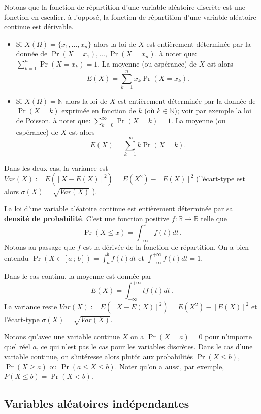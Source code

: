 \documentclass[12pt, a4paper]{book}
\numberwithin{equation}{section}
\newcommand{\N}{{\mathbb N}}
\begin{document}
Notons que la fonction de répartition d'une variable aléatoire discrète est une fonction en escalier.
à l'opposé, la fonction de répartition d'une variable aléatoire continue est dérivable.

\begin{itemize}
  \item Si $X(\Omega)=\{x_1,\hdots, x_n \}$ alors la loi de $X$ est entièrement déterminée par la donnée de $\Pr(X=x_1), \hdots, \Pr(X=x_n)$. à noter que: $\sum_{k=1}^n \Pr(X=x_k) =1$. La moyenne (ou espérance) de $X$ est alors 
\[ E(X)=\sum_{k=1}^n x_k \Pr(X=x_k). \]
	\item Si $X(\Omega)=\mathbb{\N}$ alors la loi de $X$ est entièrement déterminée
par la donnée de $\Pr(X=k)$ exprimée en fonction de $k$ (où $k \in \mathbb{\N}$);
voir par exemple la loi de Poisson. à noter que: $\sum_{k=0}^\infty \Pr(X=k) =1$.
La moyenne (ou espérance) de $X$ est alors
\[ E(X)=\sum_{k=1}^\infty k \Pr(X=k). \]
\end{itemize}
Dans les deux cas, la variance est $Var(X):= E\left([X-E(X)]^2\right) =E(X^2)-[E(X)]^2$ (l'écart-type est alors $\sigma(X)=\sqrt{Var(X)}$ ).

La loi d'une variable aléatoire continue est entièrement déterminée par sa {\bf densité de probabilité}.
C'est une fonction positive $f : \mathbb{R}\longrightarrow \mathbb{R}$ telle que
$$
\Pr(X\leq x)=\int_{-\infty}^x f(t) dt\,.
$$
Notons au passage que $f$ est la dérivée de la fonction de répartition.
On a bien entendu ${\displaystyle \Pr(X\in [a\,;\,b])=\int_a^b f(t)dt}$
et ${\displaystyle \int_{-\infty}^{+\infty} f(t)dt =1}$.


Dans le cas continu, la moyenne est donnée par
\[ E(X)=\int_{-\infty}^{+\infty} tf(t) dt\,. \]
La variance reste $Var(X):= E\left([X-E(X)]^2\right) =E(X^2)-[E(X)]^2$ et l'écart-type $\sigma(X)=\sqrt{Var(X)}$.

 Notons qu'avec une variable continue $X$ on a $\Pr(X=a)=0$ pour n'importe
quel réel $a$, ce qui  n'est pas le cas pour les variables discrètes.
Dans le cas d'une variable continue, on s'intéresse alors  plutôt aux probabilités $\Pr(X\leq b)$, $\Pr(X\geq a)$ ou $\Pr(a\leq X\leq b)$. Noter qu'on a aussi, par exemple, $P(X\leq b) =\Pr(X<b)$.\\

\subsection{Variables aléatoires indépendantes}
\end{document}
